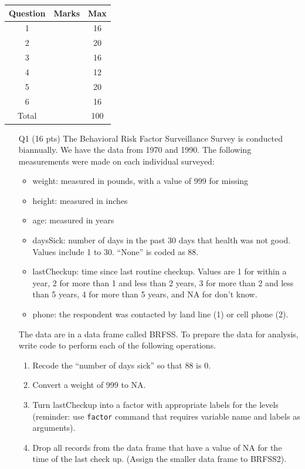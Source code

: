 \documentclass[12pt]{article}
\theoremstyle{Conjecture}
\theoremstyle{example}
\theoremstyle{remark}
\theoremstyle{lemma}
\theoremstyle{definition}
\theoremstyle{corol}
\theoremstyle{proposition}
\theoremstyle{condition}
\begin{document}
\begin{table}[!h]
\centering
\begin{tabular}{|c|c|c|}\hline
Question & Marks & Max\\ \hline
1 &  & 16\\ \hline
2 &  & 20\\ \hline
3 &  & 16\\ \hline
4 &  & 12\\ \hline
5 &  & 20\\ \hline
6 &  & 16\\ \hline
Total &  & 100\\ \hline
\end{tabular}
\end{table}


\newpage 

\begin{enumerate}

 \item[Q1] 
(16 pts) The Behavioral Risk Factor Surveillance Survey is conducted
biannually. We have the data from 1970 and 1990. The following
measurements were made on each individual surveyed:
\begin{itemize}
\item weight: measured in pounds, with a value of 999 for missing
\item height: measured in inches
\item age: measured in years
\item daysSick: number of days in the past 30 days that health was not good. Values include 1 to 30. ``None'' is coded as 88.
\item lastCheckup: time since last routine checkup. Values are 1 for within a year, 2 for more than 1 and less than 2 years, 3 for more than 2 and less than 5 years, 4 for more than 5 years, and NA for don't know.
\item phone: the respondent was contacted by land line (1) or cell
  phone (2).
\end{itemize}

The data are in a data frame called BRFSS. To prepare the data for
analysis, write code to perform each of the following operations. 
\begin{enumerate}%
\item Recode the ``number of days sick'' so that 88 is 0.
\vspace{0.5in}
\item Convert a weight of 999 to NA.
\vspace{0.5in}
\item Turn lastCheckup into a factor with appropriate labels for the levels (reminder: use {\tt factor} command that requires variable name and labels as arguments).
\vspace{0.5in}
\item Drop all records from the data frame that have a value of NA for the time of the last check up. (Assign the smaller data frame to BRFSS2).
\end{enumerate}


\end{enumerate}
\end{document}

